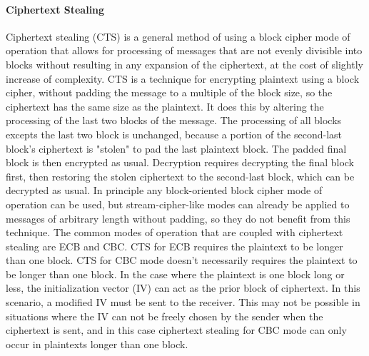 \documentclass[11pt]{article}
\begin{document}
\paragraph{Ciphertext Stealing} Ciphertext stealing (CTS) is a general method of using a block cipher mode of operation that allows for processing of messages that are not evenly divisible into blocks without resulting in any expansion of the ciphertext, at the cost of slightly  increase of complexity. CTS is a technique for encrypting plaintext using a block cipher, without padding the message to a multiple of the block size, so the ciphertext has the same size as the plaintext. It does this by altering the processing of the last two blocks of the message. The processing of all blocks excepts the last two block is unchanged, because a portion of the second-last block's ciphertext is "stolen" to pad the last plaintext block. The padded final block is then encrypted as usual. Decryption requires decrypting the final block first, then restoring the stolen ciphertext to the second-last block, which can be decrypted as usual. In principle any block-oriented block cipher mode of operation can be used, but stream-cipher-like modes can already be applied to messages of arbitrary length without padding, so they do not benefit from this technique. The common modes of operation that are coupled with ciphertext stealing are ECB and CBC. CTS for ECB requires the plaintext to be longer than one block. CTS for CBC mode doesn't necessarily requires the plaintext to be longer than one block. In the case where the plaintext is one block long or less, the initialization vector (IV) can act as the prior block of ciphertext. In this scenario, a modified IV must be sent to the receiver. This may not be possible in situations where the IV can not be freely chosen by the sender when the ciphertext is sent, and in this case ciphertext stealing for CBC mode can only occur in plaintexts longer than one block.
\end{document}
